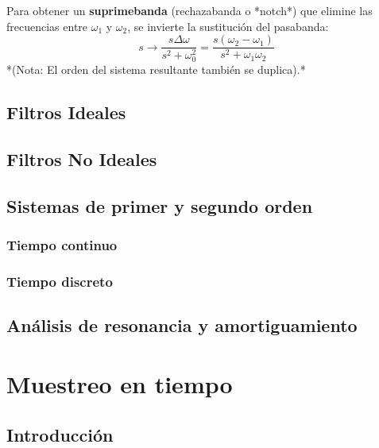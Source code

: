 \documentclass[11pt,a4paper,openany]{book}
\begin{document}
Para obtener un \textbf{suprimebanda} (rechazabanda o *notch*) que elimine las frecuencias entre $\omega_1$ y $\omega_2$, se invierte la sustitución del pasabanda:
\begin{equation}
	s \longrightarrow \frac{s \Delta\omega}{s^2 + \omega_0^2} = \frac{s (\omega_2 - \omega_1)}{s^2 + \omega_1 \omega_2}
\end{equation}
*(Nota: El orden del sistema resultante también se duplica).*

\section{Filtros Ideales}

\section{Filtros No Ideales}

\section{Sistemas de primer y segundo orden}

\subsection{Tiempo continuo}

\subsection{Tiempo discreto}

\section{Análisis de resonancia y amortiguamiento}



\chapter{Muestreo en tiempo}

\section{Introducci\'{o}n}
\end{document}
